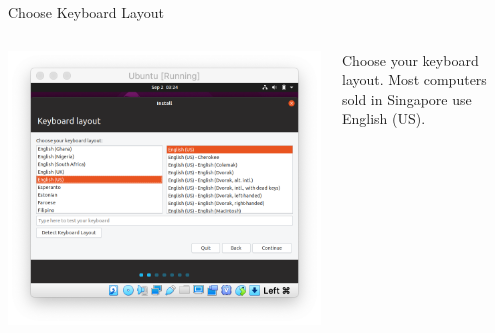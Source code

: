 \documentclass[12pt]{beamer}
\begin{document}
\begin{frame}{Choose Keyboard Layout}
  \begin{columns}
    \begin{column}{0.65\linewidth}
      \includegraphics[width=\linewidth]{ubuntu-kb}
    \end{column}
    \begin{column}{0.35\linewidth}
      Choose your keyboard layout. Most computers sold in Singapore use English (US).
    \end{column}
  \end{columns}
\end{frame}
\end{document}
